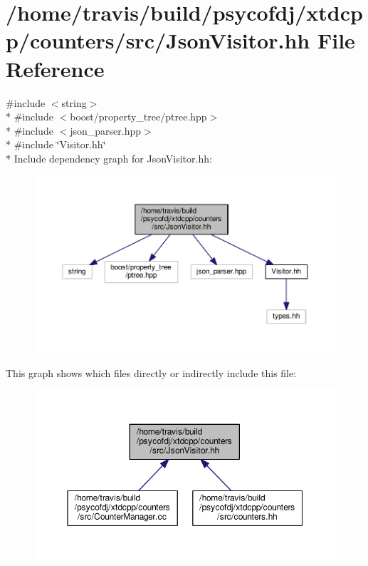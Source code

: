 \hypertarget{JsonVisitor_8hh}{\section{/home/travis/build/psycofdj/xtdcpp/counters/src/\-Json\-Visitor.hh File Reference}
\label{JsonVisitor_8hh}
}
{\ttfamily \#include $<$string$>$}\\*
{\ttfamily \#include $<$boost/property\-\_\-tree/ptree.\-hpp$>$}\\*
{\ttfamily \#include $<$json\-\_\-parser.\-hpp$>$}\\*
{\ttfamily \#include \char`\"{}Visitor.\-hh\char`\"{}}\\*
Include dependency graph for Json\-Visitor.\-hh\-:
\nopagebreak
\begin{figure}[H]
\begin{center}
\leavevmode
\includegraphics[width=350pt]{JsonVisitor_8hh__incl}
\end{center}
\end{figure}
This graph shows which files directly or indirectly include this file\-:
\nopagebreak
\begin{figure}[H]
\begin{center}
\leavevmode
\includegraphics[width=350pt]{JsonVisitor_8hh__dep__incl}
\end{center}
\end{figure}
